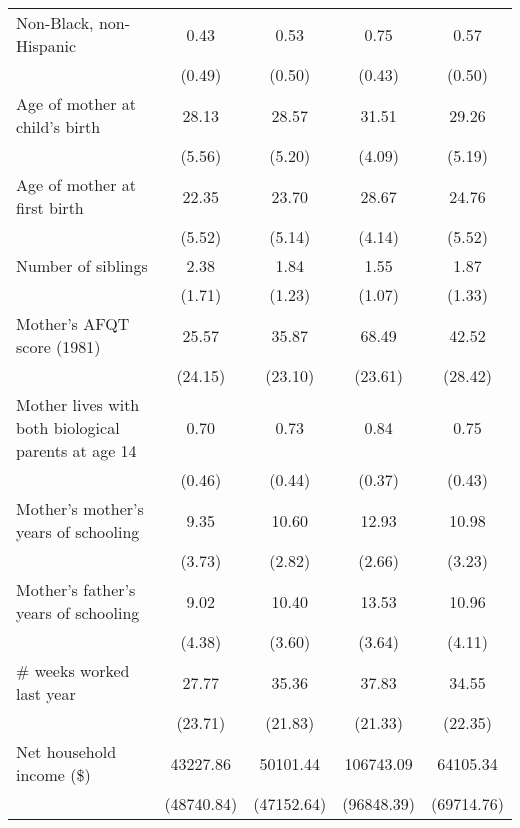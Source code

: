 \begin{table}[htbp]
\begin{tabular}{l*{4}{c}}
\addlinespace
Non-Black, non-Hispanic&        0.43&        0.53&        0.75&        0.57\\
                    &      (0.49)&      (0.50)&      (0.43)&      (0.50)\\
\addlinespace
Age of mother at child's birth&       28.13&       28.57&       31.51&       29.26\\
                    &      (5.56)&      (5.20)&      (4.09)&      (5.19)\\
\addlinespace
Age of mother at first birth&       22.35&       23.70&       28.67&       24.76\\
                    &      (5.52)&      (5.14)&      (4.14)&      (5.52)\\
\addlinespace
Number of siblings  &        2.38&        1.84&        1.55&        1.87\\
                    &      (1.71)&      (1.23)&      (1.07)&      (1.33)\\
\addlinespace
Mother's AFQT score (1981)&       25.57&       35.87&       68.49&       42.52\\
                    &     (24.15)&     (23.10)&     (23.61)&     (28.42)\\
\addlinespace
Mother lives with both biological parents at age 14&        0.70&        0.73&        0.84&        0.75\\
                    &      (0.46)&      (0.44)&      (0.37)&      (0.43)\\
\addlinespace
Mother's mother's years of schooling&        9.35&       10.60&       12.93&       10.98\\
                    &      (3.73)&      (2.82)&      (2.66)&      (3.23)\\
\addlinespace
Mother's father's years of schooling&        9.02&       10.40&       13.53&       10.96\\
                    &      (4.38)&      (3.60)&      (3.64)&      (4.11)\\
\addlinespace
$\#$ weeks worked last year&       27.77&       35.36&       37.83&       34.55\\
                    &     (23.71)&     (21.83)&     (21.33)&     (22.35)\\
\addlinespace
Net household income (\$)&    43227.86&    50101.44&   106743.09&    64105.34\\
                    &  (48740.84)&  (47152.64)&  (96848.39)&  (69714.76)\\
\bottomrule
\end{tabular}
\end{table}
